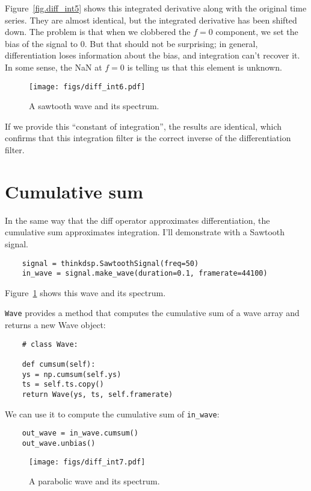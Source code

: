 Figure~\ref{fig.diff_int5} shows this integrated derivative along with
the original time series.  They are almost identical, but the
integrated derivative has been shifted down.  The problem is that when
we clobbered the $f=0$ component, we set the bias of the signal to 0.
But that should not be surprising; in general, differentiation loses
information about the bias, and integration can't recover it.  In some
sense, the NaN at $f=0$ is telling us that this element is unknown.

\begin{figure}
	\centerline{\texttt{[image: figs/diff\_int6.pdf]}}
	\caption{A sawtooth wave and its spectrum.}
	\label{fig.diff_int6}
\end{figure}

If we provide this ``constant of integration'', the results are
identical, which confirms that this integration filter is the correct
inverse of the differentiation filter.

\section{Cumulative sum}
\label{cumsum}

In the same way that the diff operator approximates differentiation,
the cumulative sum approximates integration.
I'll demonstrate with a Sawtooth signal.

\begin{verbatim}
	signal = thinkdsp.SawtoothSignal(freq=50)
	in_wave = signal.make_wave(duration=0.1, framerate=44100)
\end{verbatim}

Figure~\ref{fig.diff_int6} shows this wave and its spectrum.

{\tt Wave} provides a method that computes the cumulative sum of
a wave array and returns a new Wave object:

\begin{verbatim}
	# class Wave:
	
	def cumsum(self):
	ys = np.cumsum(self.ys)
	ts = self.ts.copy()
	return Wave(ys, ts, self.framerate)
\end{verbatim}

We can use it to compute the cumulative sum of \verb"in_wave":

\begin{verbatim}
	out_wave = in_wave.cumsum()
	out_wave.unbias()
\end{verbatim}

\begin{figure}
	\centerline{\texttt{[image: figs/diff\_int7.pdf]}}
	\caption{A parabolic wave and its spectrum.}
	\label{fig.diff_int7}
\end{figure}

